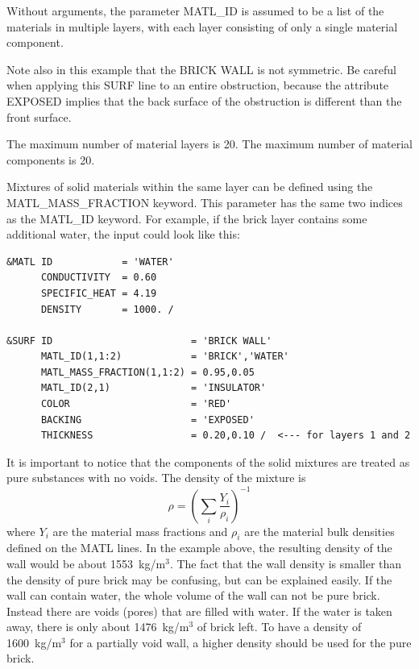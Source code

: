 \documentclass[11pt]{book}
\newcommand{\be}{\begin{equation}}
\newcommand{\ee}{\end{equation}}
\begin{document}
\noindent
Without arguments, the parameter {\ct MATL\_ID} is assumed to be a list of the materials in multiple layers, with each layer consisting of only a single
material component.

Note also in this example that the {\ct BRICK WALL} is not symmetric. Be careful when applying this {\ct SURF} line to an entire obstruction, because the
attribute {\ct EXPOSED} implies that the back surface of the obstruction is different than the front surface.

\begin{warning}
\noindent
The maximum number of material layers is 20. The maximum number of material components is 20.
\end{warning}

Mixtures of solid materials within the same layer can be defined using
the {\ct MATL\_MASS\_FRACTION} keyword. This parameter has the same two indices as the {\ct MATL\_ID} keyword. For example, if the
brick layer contains some additional water, the input could look like this:

\footnotesize
\begin{verbatim}
&MATL ID            = 'WATER'
      CONDUCTIVITY  = 0.60
      SPECIFIC_HEAT = 4.19
      DENSITY       = 1000. /

&SURF ID                        = 'BRICK WALL'
      MATL_ID(1,1:2)            = 'BRICK','WATER'
      MATL_MASS_FRACTION(1,1:2) = 0.95,0.05
      MATL_ID(2,1)              = 'INSULATOR'
      COLOR                     = 'RED'
      BACKING                   = 'EXPOSED'
      THICKNESS                 = 0.20,0.10 /  <--- for layers 1 and 2

\end{verbatim}
\normalsize
\noindent
It is important to notice that the components of the solid mixtures
are treated as pure substances with no voids. The density of the
mixture is
\be
\rho = \left(\sum_i\frac{Y_i}{\rho_i}\right)^{-1}
\ee
where $Y_i$ are the material mass fractions and $\rho_i$ are the
material bulk densities defined on the {\ct MATL} lines. In the
example above, the resulting density of the wall would be about
1553~kg/m$^3$. The fact that the wall density is smaller than the
density of pure brick may be confusing, but can be explained easily.
If the wall can contain water, the whole volume of the wall can not be
pure brick. Instead there are voids (pores) that are
filled with water. If the water is taken away, there is only about
1476~kg/m$^3$ of brick left. To have a density of 1600~kg/m$^3$ for a
partially void wall, a higher density should be used for the pure
brick.
\end{document}
